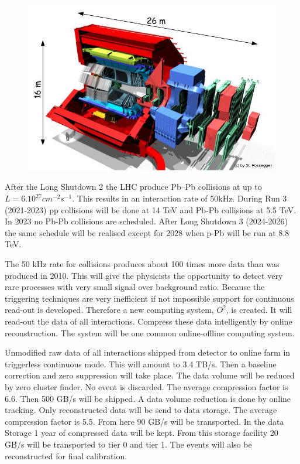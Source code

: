 \begin{figure}[h]
  \begin{center}
    \includegraphics[scale=0.4]{alice_upgrade.jpg}
    \caption{}
    \label{fig:}
  \end{center}
\end{figure}
After the Long Shutdown 2 the LHC produce Pb–Pb collisions at up to $L = 6.10^{27} cm^{-2} s^{-1}$. This results in an interaction rate of 50kHz. During Run 3 (2021-2023) pp collisions will be done at 14 TeV and Pb-Pb collisions at 5.5 TeV. In 2023 no Pb-Pb collisions are scheduled. After Long Shutdown 3 (2024-2026) the same schedule will be realised except for 2028 when p-Pb will be run at 8.8 TeV.

The 50 kHz rate for collisions produces about 100 times more data than was produced in 2010. This will give the physicists the opportunity to detect very rare processes with very small signal over background ratio. Because the triggering techniques are very inefficient if not impossible support for continuous read-out is developed. Therefore a new computing system, $O^2$, is created. It will read-out the data of all interactions. Compress these data intelligently by online reconstruction. The system will be one common online-offline computing system.

Unmodified raw data of all interactions shipped from detector to online farm in triggerless continuous mode. This will amount to 3.4 TB/s. Then a baseline correction and zero suppression will take place. The data volume will be reduced by zero cluster finder. No event is discarded. The average compression factor is 6.6. Then 500 GB/s will be shipped. A data volume reduction is done by online tracking. Only reconstructed data will be send to data storage. The average compression factor is 5.5. From here 90 GB/s will be transported. In the data Storage 1 year of compressed data will be kept. From this storage facility 20 GB/s will be transported to tier 0 and tier 1. The events will also be reconstructed for final calibration.


